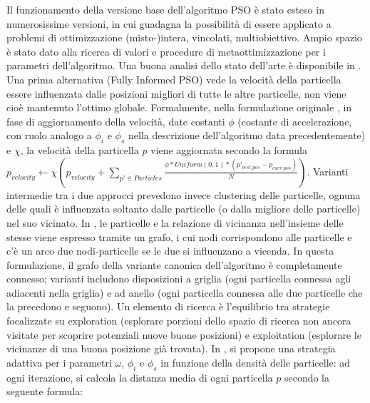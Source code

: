 \documentclass[12pt]{article}
\begin{document}
Il funzionamento della versione base dell'algoritmo PSO è stato esteso in numerosissime versioni, in cui guadagna la possibilità di essere applicato a problemi di ottimizzazione (misto-)intera, vincolati, multiobiettivo. Ampio spazio è stato dato alla ricerca di valori e procedure di metaottimizzazione per i parametri dell'algoritmo. Una buona analisi dello stato dell'arte è disponibile in \cite{ChengAl2018}. \newline
\newline
Una prima alternativa (Fully Informed PSO) vede la velocità della particella essere influenzata dalle posizioni migliori di tutte le altre particelle, non viene cioè mantenuto l'ottimo globale. Formalmente, nella formulazione originale \cite{MendesAl2004}, in fase di aggiornamento della velocità, date costanti $\phi$ (costante di accelerazione, con ruolo analogo a $\phi_i$ e $\phi_s$ nella descrizione dell'algoritmo data precedentemente) e $\chi$, la velocità della particella $p$ viene aggiornata secondo la formula \newline
\newline
$p_{velocity} \leftarrow \chi \left( p_{velocity} + \sum_{p' \in Particles} \frac{\displaystyle \phi*Uniform(0,1)*\left( p'_{best\_pos} - p_{curr\_pos}\right)}{\displaystyle N} \right)$. \newline
\newline
Varianti intermedie tra i due approcci prevedono invece clustering delle particelle, ognuna delle quali è influenzata soltanto dalle particelle (o dalla migliore delle particelle) nel suo vicinato. In \cite{KennedyMendes2003}, le particelle e la relazione di vicinanza nell'insieme delle stesse viene espresso tramite un grafo, i cui nodi corrispondono alle particelle e c'è un arco due nodi-particelle se le due si influenzano a vicenda. In questa formulazione, il grafo della variante canonica dell'algoritmo è completamente connesso; varianti includono disposizioni a griglia (ogni particella connessa agli adiacenti nella griglia) e ad anello (ogni particella connessa alle due particelle che la precedono e seguono).\newline
\newline
Un elemento di ricerca è l'equilibrio tra strategie focalizzate su exploration (esplorare porzioni dello spazio di ricerca non ancora visitate per scoprire potenziali nuove buone posizioni) e exploitation (esplorare le vicinanze di una buona posizione già trovata). In \cite{ZhanAl2009}, si propone una strategia adattiva per i parametri $\omega$, $\phi_i$ e $\phi_s$ in funzione della densità delle particelle: ad ogni iterazione, si calcola la distanza media di ogni particella $p$ secondo la seguente formula: \newline
\end{document}
